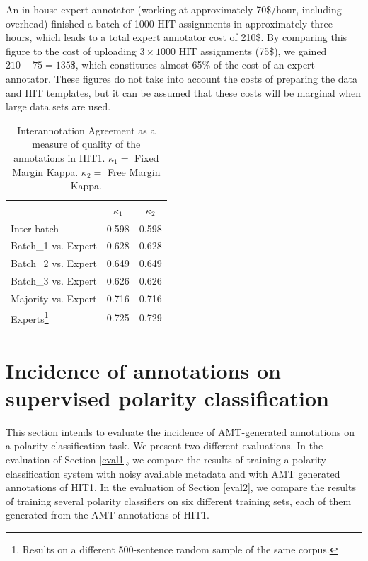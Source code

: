 \documentclass[11pt,letterpaper]{article}
\begin{document}
An in-house expert annotator (working at approximately 70\$/hour, including overhead) finished a batch of 1000 HIT assignments in approximately three hours, which leads to a total expert annotator cost of 210\$. By comparing this figure to the cost of uploading $3 \times 1000$ HIT assignments (75\$), we gained $210 - 75 = 135$\$, which constitutes almost 65\% of the cost of an expert annotator. These figures do not take into account the costs of preparing the data and HIT templates, but it can be assumed that these costs will be marginal when large data sets are used.
\begin{table}[h]
\begin{center}
\begin{tabular}{|l|c|c|}
\hline
& $\kappa_{1}$ & $\kappa_{2}$ \\ 
\hline
Inter-batch & 0.598 & 0.598 \\ \hline
Batch\_1 vs. Expert & 0.628 & 0.628\\
Batch\_2 vs. Expert & 0.649 & 0.649\\
Batch\_3 vs. Expert & 0.626 & 0.626\\ \hline
Majority vs. Expert & 0.716 & 0.716\\ \hline
Experts\footnote{Results on a different 500-sentence random sample of the same corpus.} & 0.725 & 0.729\\ \hline
\end{tabular}
\end{center}
\label{table.ita}
\caption{Interannotation Agreement as a measure of quality of the annotations in HIT1. $\kappa_{1} = $ Fixed Margin Kappa. $\kappa_{2} = $ Free Margin Kappa.}
\end{table}

\section{Incidence of annotations on supervised polarity classification}
\label{sect:classifier}

This section intends to evaluate the incidence of AMT-generated annotations on a polarity classification task. We present two different evaluations. In the evaluation of Section \ref{eval1}, we compare the results of training a polarity classification system with noisy available metadata and with AMT generated annotations of HIT1. In the evaluation of Section \ref{eval2}, we compare the results of training several polarity classifiers on six different training sets, each of them generated from the AMT annotations of HIT1.
\end{document}
